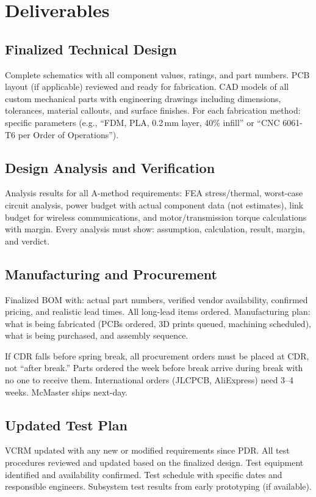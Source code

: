 \documentclass[11pt,letterpaper,twoside,openany]{book}
\begin{document}
\section{Deliverables}

\subsection{Finalized Technical Design}
Complete schematics with all component values, ratings, and part numbers. PCB layout (if applicable) reviewed and ready for fabrication. CAD models of all custom mechanical parts with engineering drawings including dimensions, tolerances, material callouts, and surface finishes. For each fabrication method: specific parameters (e.g., ``FDM, PLA, 0.2\,mm layer, 40\% infill'' or ``CNC 6061-T6 per Order of Operations'').

\subsection{Design Analysis and Verification}
Analysis results for all A-method requirements: FEA stress/thermal, worst-case circuit analysis, power budget with actual component data (not estimates), link budget for wireless communications, and motor/transmission torque calculations with margin. Every analysis must show: assumption, calculation, result, margin, and verdict.

\subsection{Manufacturing and Procurement}
Finalized BOM with: actual part numbers, verified vendor availability, confirmed pricing, and realistic lead times. All long-lead items ordered. Manufacturing plan: what is being fabricated (PCBs ordered, 3D prints queued, machining scheduled), what is being purchased, and assembly sequence.

\begin{tipbox}
If CDR falls before spring break, all procurement orders must be placed at CDR, not ``after break.'' Parts ordered the week before break arrive during break with no one to receive them. International orders (JLCPCB, AliExpress) need 3--4 weeks. McMaster ships next-day.
\end{tipbox}

\subsection{Updated Test Plan}
VCRM updated with any new or modified requirements since PDR. All test procedures reviewed and updated based on the finalized design. Test equipment identified and availability confirmed. Test schedule with specific dates and responsible engineers. Subsystem test results from early prototyping (if available).
\end{document}
